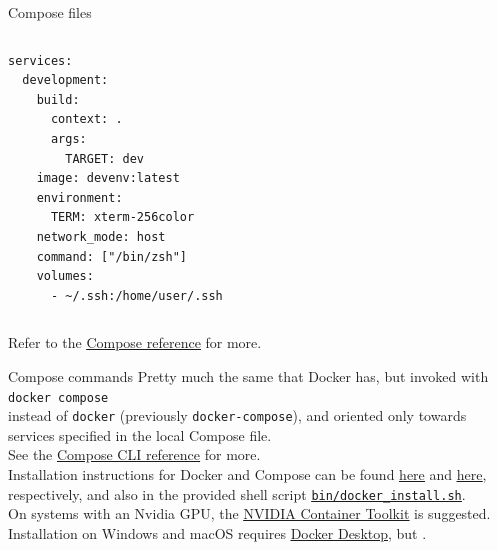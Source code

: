 \begin{frame}[fragile]{Compose files}
	\begin{columns}
		\begin{lstlisting}[language=compose, caption=Minimal example of a Compose file.]
services:
  development:
    build:
      context: .
      args:
        TARGET: dev
    image: devenv:latest
    environment:
      TERM: xterm-256color
    network_mode: host
    command: ["/bin/zsh"]
    volumes:
      - ~/.ssh:/home/user/.ssh
\end{lstlisting}
	\end{columns}
	Refer to the \href{https://docs.docker.com/compose/compose-file/}{\color{blue}\underline{Compose reference}} for more.
\end{frame}

\begin{frame}{Compose commands}
	Pretty much the same that Docker has, but invoked with\\
  \bigskip
	\texttt{docker compose}\\
  \bigskip
	instead of \texttt{docker} (previously \texttt{docker-compose}), and oriented only towards services specified in the local Compose file.\\
  \bigskip
	See the \href{https://docs.docker.com/compose/reference/}{\color{blue}\underline{Compose CLI reference}} for more.\\
  \bigskip
  Installation instructions for Docker and Compose can be found \href{https://docs.docker.com/engine/install/ubuntu/}{\color{blue}\underline{here}} and \href{https://docs.docker.com/compose/install/linux/}{\color{blue}\underline{here}}, respectively, and also in the provided shell script \href{https://github.com/IntelligentSystemsLabUTV/ros2-examples/blob/humble/bin/docker_install.sh}{\color{blue}\underline{\texttt{bin/docker\_install.sh}}}.\\
  On systems with an Nvidia GPU, the \href{https://docs.nvidia.com/datacenter/cloud-native/container-toolkit/overview.html}{\color{blue}\underline{NVIDIA Container Toolkit}} is suggested.\\
  Installation on Windows and macOS requires \href{https://www.docker.com/products/docker-desktop/}{\color{blue}\underline{Docker Desktop}}, but .
\end{frame}

